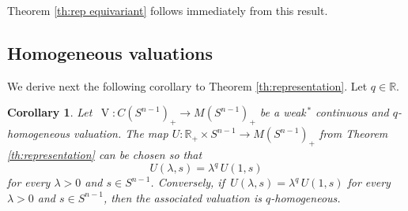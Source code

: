 \documentclass[11pt, a4paper]{amsart}
\newtheorem{corollary}[proposition]{Corollary}
\newcommand{\rp}{\mathbb R_{\scriptscriptstyle +}}
\newcommand{\sn}{{S^{n-1}}}
\newcommand{\oV}{\operatorname{V}}
\newcommand{\measn}{M(\sn )_{\scriptscriptstyle +}}
\newcommand{\cfn}{C(\sn )_{\scriptscriptstyle +}}
\newcommand{\R}{\mathbb R}
\begin{document}
\noindent
Theorem \ref{th:rep equivariant} follows immediately from this result.

\subsection{Homogeneous valuations}
We derive next the following corollary to Theorem \ref{th:representation}. Let $q\in\R$.

\begin{corollary}\label{c:hom}
Let $\,\oV\colon \cfn\to \measn$ be a weak$^{\,*}$\! continuous and \mbox{$q$-homogeneous} valuation. The map $U\colon \rp \times \sn\!  \to \measn$ from Theorem \ref{th:representation} can be chosen so that $$U(\lambda, s)=\lambda^q\, U(1,s)$$
for every $\lambda> 0$ and  $s\in \sn $. Conversely, if $\,U(\lambda, s)=\lambda^q\, U(1,s)$ for every $\lambda> 0$ and  $s\in \sn $, then the associated valuation is $q$-homogeneous. 
\end{corollary} 
\end{document}
